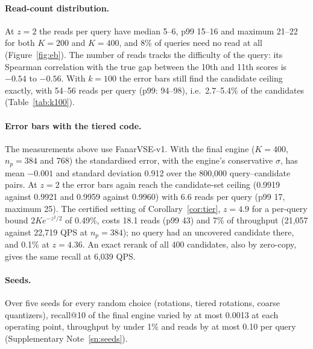\documentclass[fleqn,10pt]{wlscirep}
\begin{document}
\paragraph{Read-count distribution.} At $z=2$ the reads per query have median 5--6, p99 15--16 and maximum 21--22 for both $K=200$ and $K=400$, and 8\% of queries need no read at all (Figure~\ref{fig:eb}). The number of reads tracks the difficulty of the query: its Spearman correlation with the true gap between the 10th and 11th scores is $-0.54$ to $-0.56$. With $k=100$ the error bars still find the candidate ceiling exactly, with 54--56 reads per query (p99: 94--98), i.e.\ 2.7--5.4\% of the candidates (Table~\ref{tab:k100}).

\paragraph{Error bars with the tiered code.} The measurements above use FanarVSE-v1. With the final engine ($K=400$, $n_p=384$ and 768) the standardised error, with the engine's conservative $\sigma$, has mean $-0.001$ and standard deviation 0.912 over the 800{,}000 query--candidate pairs. At $z=2$ the error bars again reach the candidate-set ceiling (0.9919 against 0.9921 and 0.9959 against 0.9960) with 6.6 reads per query (p99 17, maximum 25). The certified setting of Corollary~\ref{cor:tier}, $z=4.9$ for a per-query bound $2K e^{-z^2/2}$ of 0.49\%, costs 18.1 reads (p99 43) and 7\% of throughput (21{,}057 against 22{,}719 QPS at $n_p=384$); no query had an uncovered candidate there, and 0.1\% at $z=4.36$. An exact rerank of all 400 candidates, also by zero-copy, gives the same recall at 6{,}039 QPS.

\paragraph{Seeds.} Over five seeds for every random choice (rotations, tiered rotations, coarse quantizers), recall@10 of the final engine varied by at most 0.0013 at each operating point, throughput by under 1\% and reads by at most 0.10 per query (Supplementary Note~\ref{sn:seeds}).
\end{document}
